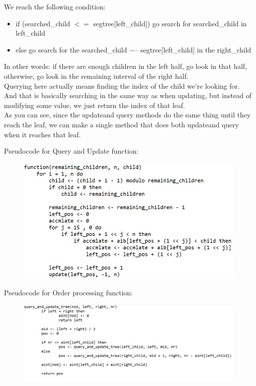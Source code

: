 \documentclass{article}
\begin{document}
We  reach  the  following  condition:  
\begin{itemize}
    \item if  (searched\_child $ <= $ segtree[left\_child])  go  search  for  searched\_child  in  left\_child
    \item else go  search  for  the  searched\_child $ -– $  segtree[left\_child]  in  the  right\_child
\end{itemize}    
In  other  words:  if  there  are  enough  children  in  the  left  half,  go  look  in  that  half,  otherwise,  go  look  in  the  remaining  interval  of  the  right  half.\\

Querying  here  actually  means  finding  the  index  of  the  child  we’re  looking  for.  And  that  is  basically  searching  in  the  same  way  as  when  updating,  but  instead  of  modifying  some  value,  we  just  return  the  index  of  that  leaf.  
\\As  you  can  see,  since  the  updateand  query  methods  do  the  same  thing  until  they  reach  the  leaf,  we  can  make  a  single  method  that  does  both  updateand  query  when  it  reaches  that  leaf.

Pseudocode for Query and Update function: 

\begin{figure}[h!]
\includegraphics[scale=0.7]{function.jpg}
\end{figure}

Pseudocode for Order processing function:

\begin{figure}[h!]
\includegraphics[scale=0.7]{query.jpg}
\end{figure}
\end{document}
